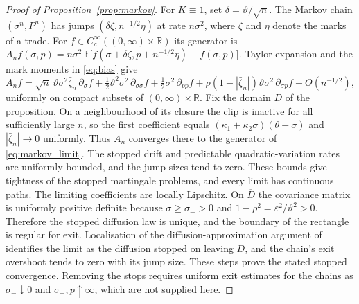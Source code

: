 \documentclass{rQUF2e}
\theoremstyle{plain}
\theoremstyle{definition}
\theoremstyle{remark}
\newcommand{\E}{\mathbb{E}}
\begin{document}
\begin{proof}[Proof of Proposition~\ref{prop:markov}] For $K\equiv1$, set $\delta=\vartheta/\sqrt n$. The Markov chain $(\sigma^n,P^n)$ has jumps $(\delta\zeta,n^{-1/2}\eta)$ at rate $n\sigma^2$, where $\zeta$ and $\eta$ denote the marks of a trade. For $f\in C_c^\infty((0,\infty)\times\mathbb R)$ its generator is $A_nf(\sigma,p)=n\sigma^2\,\E\big[f(\sigma+\delta\zeta,p+n^{-1/2}\eta)-f(\sigma,p)\big]$. Taylor expansion and the mark moments in \eqref{eq:bias} give
\begin{equation*}
A_nf=\sqrt n\,\vartheta\sigma^2\bar\zeta_n\,\partial_\sigma f+\tfrac12\vartheta^2\sigma^2\,\partial_{\sigma\sigma}f+\tfrac12\sigma^2\,\partial_{pp}f+\rho(1-|\bar\zeta_n|)\vartheta\sigma^2\,\partial_{\sigma p}f+O(n^{-1/2}),
\end{equation*}
uniformly on compact subsets of $(0,\infty)\times\mathbb R$. Fix the domain $D$ of the proposition. On a neighbourhood of its closure the clip is inactive for all sufficiently large $n$, so the first coefficient equals $(\kappa_1+\kappa_2\sigma)(\theta-\sigma)$ and $|\bar\zeta_n|\to0$ uniformly. Thus $A_n$ converges there to the generator of \eqref{eq:markov_limit}. The stopped drift and predictable quadratic-variation rates are uniformly bounded, and the jump sizes tend to zero. These bounds give tightness of the stopped martingale problems, and every limit has continuous paths. The limiting coefficients are locally Lipschitz. On $\overline D$ the covariance matrix is uniformly positive definite because $\sigma\ge\sigma_->0$ and $1-\rho^2=\varepsilon^2/\vartheta^2>0$. Therefore the stopped diffusion law is unique, and the boundary of the rectangle is regular for exit. Localisation of the diffusion-approximation argument of \citet{EthierKurtz1986} identifies the limit as the diffusion stopped on leaving $D$, and the chain's exit overshoot tends to zero with its jump size. These steps prove the stated stopped convergence. Removing the stops requires uniform exit estimates for the chains as $\sigma_-\downarrow0$ and $\sigma_+,\bar p\uparrow\infty$, which are not supplied here. \end{proof}
\end{document}
